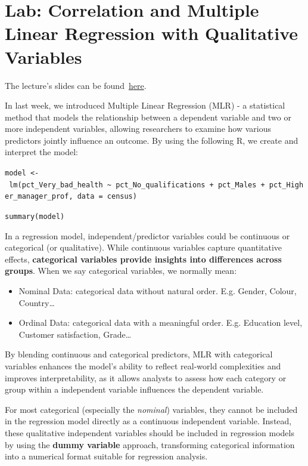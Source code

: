 \documentclass[
  letterpaper,
  DIV=11,
  numbers=noendperiod]{scrreprt}
\begin{document}

\chapter{Lab: Correlation and Multiple Linear Regression with
Qualitative
Variables}\label{lab-correlation-and-multiple-linear-regression-with-qualitative-variables}

The lecture's slides can be
found~\href{https://github.com/GDSL-UL/stats/blob/main/lectures/lecture09.pdf}{h}\href{https://github.com/GDSL-UL/stats/blob/main/lectures/lecture03.pdf}{e}\href{https://github.com/GDSL-UL/stats/blob/main/lectures/lecture09.pdf}{re}.

In last week, we introduced Multiple Linear Regression (MLR) - a
statistical method that models the relationship between a dependent
variable and two or more independent variables, allowing researchers to
examine how various predictors jointly influence an outcome. By using
the following R, we create and interpret the model:

\texttt{model\ \textless{}-\ lm(pct\_Very\_bad\_health\ \textasciitilde{}\ pct\_No\_qualifications\ +\ pct\_Males\ +\ pct\_Higher\_manager\_prof,\ data\ =\ census)}

\texttt{summary(model)}

In a regression model, independent/predictor variables could be
continuous or categorical (or qualitative). While continuous variables
capture quantitative effects, \textbf{categorical variables provide
insights into differences across groups}. When we say categorical
variables, we normally mean:

\begin{itemize}
\item
  Nominal Data: categorical data without natural order. E.g. Gender,
  Colour, Country\ldots{}
\item
  Ordinal Data: categorical data with a meaningful order. E.g. Education
  level, Customer satisfaction, Grade\ldots{}
\end{itemize}

By blending continuous and categorical predictors, MLR with categorical
variables enhances the model's ability to reflect real-world
complexities and improves interpretability, as it allows analysts to
assess how each category or group within a independent variable
influences the dependent variable.

For most categorical (especially the \emph{nominal}) variables, they
cannot be included in the regression model directly as a continuous
independent variable. Instead, these qualitative independent variables
should be included in regression models by using the \textbf{dummy
variable} approach, transforming categorical information into a
numerical format suitable for regression analysis.
\end{document}
